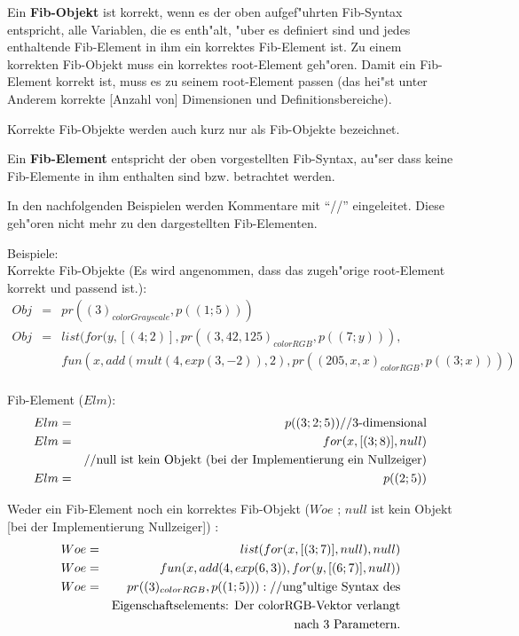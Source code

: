 Ein \textbf{Fib-Objekt} ist korrekt, wenn es der oben aufgef"uhrten Fib-Syntax entspricht, alle Variablen, die es enth"alt, "uber es definiert sind und jedes enthaltende Fib-Element in ihm ein korrektes Fib-Element ist. Zu einem korrekten Fib-Objekt muss ein korrektes root-Element geh"oren. Damit ein Fib-Element korrekt ist, muss es zu seinem root-Element passen (das hei"st unter Anderem korrekte [Anzahl von] Dimensionen und Definitionsbereiche).

Korrekte Fib-Objekte werden auch kurz nur als Fib-Objekte bezeichnet.

\bigskip\noindent
Ein \textbf{Fib-Element} entspricht der oben vorgestellten Fib-Syntax, au"ser dass keine Fib-Elemente in ihm enthalten sind bzw. betrachtet werden.

\bigskip\noindent
In den nachfolgenden Beispielen werden Kommentare mit ``//'' eingeleitet. Diese geh"oren nicht mehr zu den dargestellten Fib-Elementen.

\begin{flushleft}
Beispiele:\\
Korrekte Fib-Objekte (Es wird angenommen, dass das zugeh"orige root-Element korrekt und passend ist.):
\begin{eqnarray*}
Obj &=& pr( (3)_{colorGrayscale}, p((1;5)))\\
Obj &=& list( for(y,[(4;2)], pr( (3, 42, 125)_{colorRGB} , p((7;y))), \\
&& fun(x,add( mult(4, exp( 3, -2)), 2 ), pr( (205, x ,x)_{colorRGB}, p((3;x)) ) )\\
\end{eqnarray*}

Fib-Element ($Elm$):
\begin{eqnarray*}
Elm &=& p((3;2;5)) \textnormal{//3-dimensional}\\
Elm &=& for(x,[(3;8)],null) \\
& & \textnormal{//null ist kein Objekt (bei der Implementierung ein Nullzeiger)}\\
Elm &=& p((2;5))\\
\end{eqnarray*}

Weder ein Fib-Element noch ein korrektes Fib-Objekt ($Woe$ ; $null$ ist kein Objekt [bei der Implementierung Nullzeiger]) :\\
\begin{eqnarray*}
Woe &=& list( for( x, [(3;7)], null), null)\\
Woe &=& fun( x, add(4, exp(6, 3) ) , for(y, [(6;7)], null))\\
Woe &=& pr( (3)_{colorRGB}, p((1;5)) ): \textnormal{//ung"ultige Syntax des} \\
&& \textnormal{Eigenschaftselements: Der colorRGB-Vektor verlangt}\\
&& \textnormal{nach 3 Parametern.}\\
\end{eqnarray*}

\end{flushleft}


